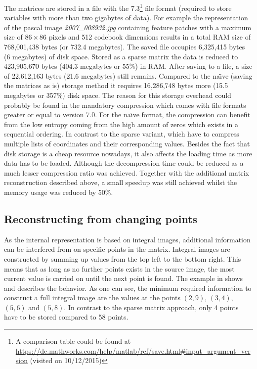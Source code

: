 The matrices are stored in a \MATLAB file with the 7.3\footnote{A comparison table could be found at \url{https://de.mathworks.com/help/matlab/ref/save.html\#input_argument_version} (visited on 10/12/2015)} file format (required to store variables with more than two gigabytes of data).
For example the representation of the pascal image \textit{2007\_008932.jpg} containing feature patches with a maximum size of $86\times86$ pixels and 512 codebook dimensions results in a total \ac{RAM} size of 768,001,438 bytes (or 732.4 megabytes). The saved \MATLAB file occupies 6,325,415 bytes (6 megabytes) of disk space.
Stored as a sparse matrix the data is reduced to 423,905,670 bytes (404.3 megabytes or 55\%) in \ac{RAM}. After saving to a file, a size of 22,612,163 bytes (21.6 megabytes) still remains. Compared to the na\"{\i}ve (saving the matrices as is) storage method it requires 16,286,748 bytes more (15.5 megabytes or 357\%) disk space. The reason for this storage overhead could probably be found in the mandatory compression which comes with file formats greater or equal to version 7.0. For the na\"{\i}ve format, the compression can benefit from the low entropy coming from the high amount of zeros which exists in a sequential ordering. In contrast to the sparse variant, which have to compress multiple lists of coordinates and their corresponding values. Besides the fact that disk storage is a cheap resource nowadays, it also affects the loading time as more data has to be loaded. Although the decompression time could be reduced as a much lesser compression ratio was achieved. Together with the additional matrix reconstruction described above, a small speedup was still achieved whilst the memory usage was reduced by 50\%.

\subsection{Reconstructing from changing points}

As the internal representation is based on integral images, additional information can be interfered from on specific points in the matrix. Integral images are constructed by summing up values from the top left to the bottom right. This means that as long as no further points exists in the source image, the most current value is carried on until the next point is found. The example in  shows and describes the behavior. As one can see, the minimum required information to construct a full integral image are the values at the points $(2,9)$, $(3,4)$, $(5,6)$ and $(5,8)$. In contrast to the sparse matrix approach, only 4 points have to be stored compared to 58 points.

